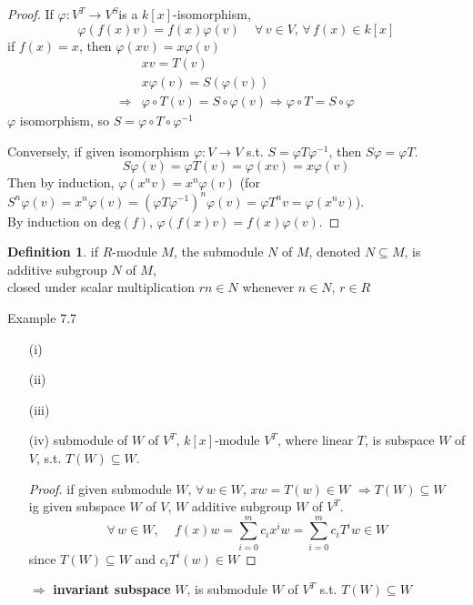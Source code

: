 \documentclass[twoside,landscape]{amsart}
\theoremstyle{plain}
\theoremstyle{definition}
\newtheorem{definition}{Definition}
\theoremstyle{remark}
\begin{document}
\begin{multicols*}{2}
\begin{proof}
If $\varphi:V^T \to V^S$is a $k[x]$-isomorphism, 
\[
\varphi(f(x)v) = f(x)\varphi(v) \quad \, \forall \, v \in V , \, \forall \, f(x) \in k[x]
\]
if $f(x)=x$, then $\varphi(xv) = x\varphi(v)$
\[
\begin{aligned}
  & xv = T(v) \\ 
  & x\varphi(v) = S(\varphi(v)) \\ 
 \Longrightarrow & \varphi \circ T(v) = S \circ \varphi(v) \Longrightarrow \varphi \circ T = S \circ \varphi 
\end{aligned}
\]
$\varphi$ isomorphism, so $S = \varphi \circ T \circ \varphi^{-1}$

Conversely, if given isomorphism $\varphi: V \to V$ s.t. $S = \varphi T \varphi^{-1}$, then $S\varphi = \varphi T$.  
\[
S\varphi(v) = \varphi T(v) = \varphi(xv) = x\varphi(v)
\]
Then by induction, $\varphi(x^nv) = x^n\varphi(v)$ (for $S^n\varphi(v) = x^n\varphi(v) = (\varphi T \varphi^{-1})^n \varphi(v) = \varphi T^n v = \varphi(x^nv)$).  \\
By induction on $\text{deg}(f)$, $\varphi(f(x)v) = f(x)\varphi(v)$.  


\end{proof}

\begin{definition}
  if $R$-module $M$, the submodule $N$ of $M$, denoted $N\subseteq M$, is additive subgroup $N$ of $M$, \\
closed under scalar multiplication $rn \in N$ whenever $n\in N$, $r\in R$
\end{definition}

Example 7.7 
\begin{enumerate}
  \item[(i)]
  \item[(ii)]
  \item[(iii)]
  \item[(iv)] submodule of $W$ of $V^T$, $k[x]$-module $V^T$, where linear $T$, is subspace $W$ of $V$, s.t. $T(W) \subseteq W$.  

\begin{proof}
  if given submodule $W$, $\forall \, w \in W$, $xw = T(w) \in W$ $\Longrightarrow T(W) \subseteq W$ \\
ig given subspace $W$ of $V$, $W$ additive subgroup $W$ of $V^T$.  
\[
\forall \, w \in W , \quad \, f(x)w = \sum_{i=0}^m c_ix^iw = \sum_{i=0}^m c_iT^iw \in W
\]
since $T(W) \subseteq W$ and $c_iT^i(w) \in W$
\end{proof}
$\Longrightarrow $ \textbf{invariant subspace } $W$, is submodule $W$ of $V^T$ s.t. $T(W) \subseteq W$
\end{enumerate}



\end{multicols*}
\end{document}
